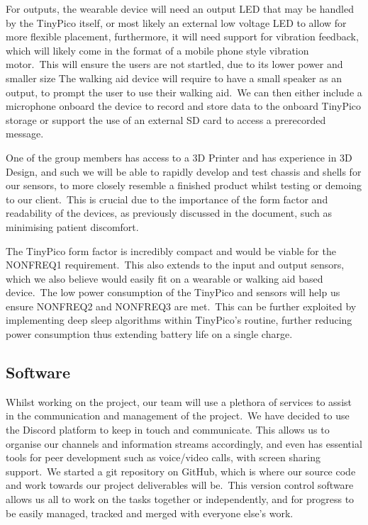             For outputs, the wearable device will need an output LED that may be handled by the TinyPico itself, or most
            likely an external low voltage LED to allow for more flexible placement, furthermore, it will need support
            for vibration feedback, which will likely come in the format of a mobile phone style vibration motor.\ This
            will ensure the users are not startled, due to its lower power and smaller size The walking aid device will
            require to have a small speaker as an output, to prompt the user to use their walking aid.\ We can
            then either include a microphone onboard the device to record and store data to the onboard TinyPico
            storage or support the use of an external SD card to access a prerecorded message.

            One of the group members has access to a 3D Printer and has experience in 3D Design, and such we will be
            able to rapidly develop and test chassis and shells for our sensors, to more closely resemble a finished
            product whilst testing or demoing to our client.\ This is crucial due to the importance of the form factor
            and readability of the devices, as previously discussed in the document, such as minimising patient discomfort.

            The TinyPico form factor is incredibly compact and would be viable for the NONFREQ1 requirement.\ This also
            extends to the input and output sensors, which we also believe would easily fit on a wearable or walking aid
            based device.\ The low power consumption of the TinyPico and sensors will help us ensure NONFREQ2 and
            NONFREQ3 are met.\ This can be further exploited by implementing deep sleep algorithms within TinyPico's
            routine, further reducing power consumption thus extending battery life on a single charge.

        \subsection{Software}
            Whilst working on the project, our team will use a plethora of services to assist in the communication and
            management of the project.\ We have decided to use the Discord platform to keep in touch and communicate.
            This allows us to organise our channels and information streams accordingly, and even has essential tools
            for peer development such as voice/video calls, with screen sharing support.\ We started a git repository on
            GitHub, which is where our source code and work towards our project deliverables will be.\ This version
            control software allows us all to work on the tasks together or independently, and for progress to be easily
            managed, tracked and merged with everyone else's work.

